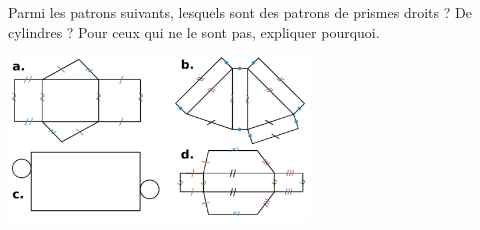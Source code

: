 
\begin{exercice}\label{exo2smath-0301}

 Parmi les patrons suivants, lesquels sont des patrons de prismes droits ? De cylindres ?  Pour ceux qui ne le sont pas, expliquer pourquoi.

\includegraphics[width=8cm]{despatrons.pdf}

\end{exercice}
